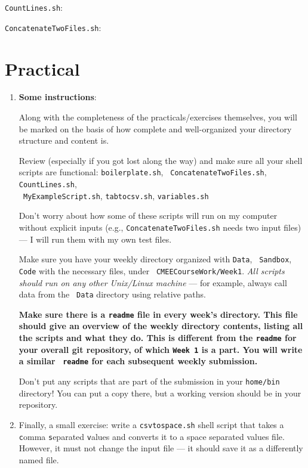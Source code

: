 {\tt CountLines.sh}:


{\tt ConcatenateTwoFiles.sh}:


\section[Practical]{Practical}
  \begin{enumerate} \itemsep10pt
		\item {\bf Some instructions}:
		
		Along with the completeness of the practicals/exercises themselves, 
		you will be marked on the basis of how complete and well-organized 
		your directory structure and content is. 

		Review (especially if you got lost along the way) and make sure all 
		your shell scripts are functional: {\tt boilerplate.sh}, {\tt 
		ConcatenateTwoFiles.sh}, {\tt CountLines.sh},\\ {\tt 
		MyExampleScript.sh}, {\tt tabtocsv.sh}, {\tt variables.sh}
		
		Don't worry about how some of these scripts will run on my computer 
		without explicit inputs (e.g., {\tt ConcatenateTwoFiles.sh} needs 
		two input files) --- I will run them with my own test files.

	 Make sure you have your weekly directory organized with {\tt Data}, {\tt 
	 Sandbox}, {\tt Code} with the necessary files, under {\tt 
	 CMEECourseWork/Week1}. {\it All scripts should run on any other 
	 Unix/Linux machine} --- for example, always call data from the {\tt 
	 Data} directory using relative paths.
	 
		{\bf Make sure there is a {\tt readme} file in every week's 
		directory. This file should give an overview of the weekly 
		directory contents, listing all the scripts and what they do. This 
		is different from the {\tt readme} for your overall git repository, 
		of which {\tt Week 1} is a part. You will write a similar {\tt 
		readme} for each subsequent weekly submission.  

		Don't put any scripts that are part of the submission in 
	 your {\tt \/home/bin} directory! You can put a copy there, but a 
	 working version should be in your repository.}
   
   
	 \item Finally, a small exercise: write a {\tt csvtospace.sh} shell 
	 script that takes a {\tt c}omma {\tt s}eparated {\tt v}alues and 
	 converts it to a space separated values file. However, it must not 
	 change the input file --- it should save it as a differently named 
	 file. 
	 

\end{enumerate}
